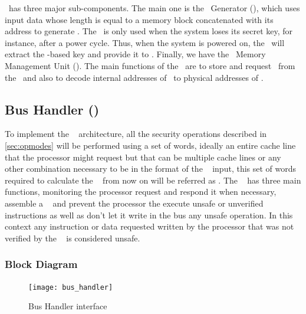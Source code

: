 \seceng~has three major sub-components. The main one is the \ptag~Generator (\ptaggen), which uses input data whose length is equal to a memory block concatenated with its address to generate \ptags. The \fuzzy~is only used when the system loses its secret key, for instance, after a power cycle. Thus, when the system is powered on, the \fuzzy~will extract the \puf-based key and provide it to \ptaggen. Finally, we have the \ptag~Memory Management Unit (\pmmu). The main functions of the \pmmu~are to store and request \ptags~from the \ptagmem~and also to decode internal addresses of \ptags~to physical addresses of \ptagmem. 


\subsection{Bus Handler (\handler)}
\label{subsec:bushandler}
To implement the \cshia~ architecture, all the security operations described in \ref{sec:opmodes} will be performed using a set of words, ideally an entire cache line that the processor might request but that can be multiple cache lines or any other combination necessary to be in the format of the \seceng~ input, this set of words required to calculate the \ptags~ from now on will be referred as \sline.  The \handler~ has three main functions, monitoring the processor request and respond it when necessary, assemble a \sline~  and prevent the processor the execute unsafe or unverified instructions  as well as don't let  it  write in the bus any unsafe operation. In this context any instruction or data requested written by the processor that was not verified by the \seceng~ is considered unsafe.



\subsubsection{Block Diagram}

\begin{figure}[!ht]
    \centering
    \texttt{[image: bus\_handler]}
    \caption{Bus Handler  interface }
    \label{fig:bhbb}
\end{figure}


